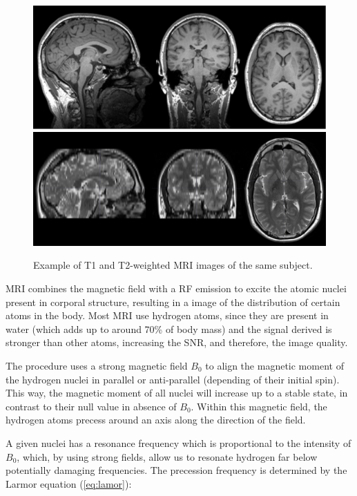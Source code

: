 \begin{figure}[htp]
	\centering
	\includegraphics[width=0.7\linewidth]{gfx/ch1/example_MRIT1}\\
	\includegraphics[width=0.7\linewidth]{gfx/ch1/example_MRIT2}
	\caption[Example of T1 and T2-weighted MRI images.]{Example of T1 and T2-weighted MRI images of the same subject.}
	\label{fig:example_MRI}
\end{figure}

\ac{MRI} combines the magnetic field with a \ac{RF} emission to excite the atomic nuclei present in corporal structure, resulting in a image of the distribution of certain atoms in the body. Most \ac{MRI} use hydrogen atoms, since they are present in water (which adds up to around 70\% of body mass) and the signal derived is stronger than other atoms, increasing the \ac{SNR}, and therefore, the image quality. 

The procedure uses a strong magnetic field $B_0$ to align the magnetic moment of the hydrogen nuclei in parallel or anti-parallel (depending of their initial spin). This way, the magnetic moment of all nuclei will increase up to a stable state, in contrast to their null value in absence of $B_0$. Within this magnetic field, the hydrogen atoms precess around an axis along the direction of the field. 

A given nuclei has a resonance frequency which is proportional to the intensity of $B_0$, which, by using strong fields, allow us to resonate hydrogen far below potentially damaging frequencies. The precession frequency is determined by the Larmor equation (\ref{eq:lamor}):

